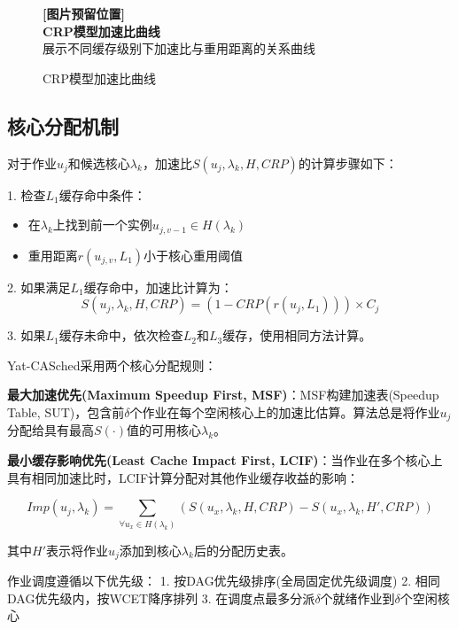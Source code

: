 \begin{figure}[htbp]
\centering
\begin{tcolorbox}[
    colback=gray!10,
    colframe=gray!50,
    width=0.8\textwidth,
    center,
    arc=3pt
]
\centering
\textbf{[图片预留位置]}\\
\textbf{CRP模型加速比曲线}\\
\footnotesize{展示不同缓存级别下加速比与重用距离的关系曲线}
\end{tcolorbox}
\caption{CRP模型加速比曲线}
\label{fig:crp_curve}
\end{figure}

\subsection{核心分配机制}

对于作业$u_j$和候选核心$\lambda_k$，加速比$S(u_j, \lambda_k, H, CRP)$的计算步骤如下：

1. 检查$L_1$缓存命中条件：
   \begin{itemize}
       \item 在$\lambda_k$上找到前一个实例$u_{j,v-1} \in H(\lambda_k)$
       \item 重用距离$r(u_{j,v}, L_1)$小于核心重用阈值
   \end{itemize}

2. 如果满足$L_1$缓存命中，加速比计算为：
   $$S(u_j, \lambda_k, H, CRP) = (1 - CRP(r(u_j, L_1))) \times C_j$$

3. 如果$L_1$缓存未命中，依次检查$L_2$和$L_3$缓存，使用相同方法计算。

Yat-CASched采用两个核心分配规则：

\textbf{最大加速优先(Maximum Speedup First, MSF)}：MSF构建加速表(Speedup Table, SUT)，包含前$\delta$个作业在每个空闲核心上的加速比估算。算法总是将作业$u_j$分配给具有最高$S(\cdot)$值的可用核心$\lambda_k$。

\textbf{最小缓存影响优先(Least Cache Impact First, LCIF)}：当作业在多个核心上具有相同加速比时，LCIF计算分配对其他作业缓存收益的影响：

$$Imp(u_j, \lambda_k) = \sum_{\forall u_x \in H(\lambda_k)} (S(u_x, \lambda_k, H, CRP) - S(u_x, \lambda_k, H', CRP))$$

其中$H'$表示将作业$u_j$添加到核心$\lambda_k$后的分配历史表。

作业调度遵循以下优先级：
1. 按DAG优先级排序(全局固定优先级调度)
2. 相同DAG优先级内，按WCET降序排列
3. 在调度点最多分派$\delta$个就绪作业到$\delta$个空闲核心

